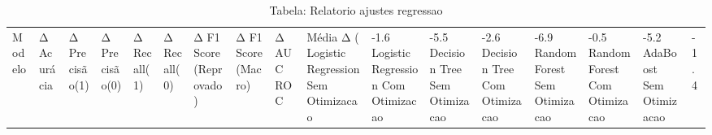 \begin{table}[H] %
    \centering
    \caption{Tabela: Relatorio ajustes regressao}
    \label{tab:relatorio_ajustes_regressao}
    \renewcommand{\arraystretch}{1.25} %
    \begin{adjustwidth}{ -1in }{ -1in } %
    \centering %
    \small %
    \begin{tabular}{lllllllllll}
\toprule
                            Modelo & Δ Acurácia & Δ Precisão(1) & Δ Precisão(0) & Δ Recall(1) & Δ Recall(0) & Δ F1 Score (Reprovado) & Δ F1 Score (Macro) & Δ AUC ROC & Média Δ (%
\midrule
Logistic Regression Sem Otimizacao &      -1.6%
Logistic Regression Com Otimizacao &      -5.5%
      Decision Tree Sem Otimizacao &      -2.6%
      Decision Tree Com Otimizacao &      -6.9%
      Random Forest Sem Otimizacao &      -0.5%
      Random Forest Com Otimizacao &      -5.2%
           AdaBoost Sem Otimizacao &      -1.4%

\end{tabular}
\end{adjustwidth}
\end{table}
